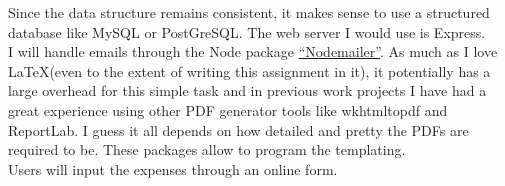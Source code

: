 \documentclass{homework}
\begin{document}
\begin{solution}
    Since the data structure remains consistent, it makes sense to use a structured database like MySQL or PostGreSQL. The web server I would use is Express.\\

    I will handle emails through the Node package \href{https://nodemailer.com/}{``Nodemailer''}. As much as I love \LaTeX (even to the extent of writing this assignment in it), it potentially has a large overhead for this simple task and in previous work projects I have had a great experience using other PDF generator tools like wkhtmltopdf and ReportLab. I guess it all depends on how detailed and pretty the PDFs are required to be. These packages allow to program the templating. \\

    Users will input the expenses through an online form. 

\end{solution}
\end{document}

